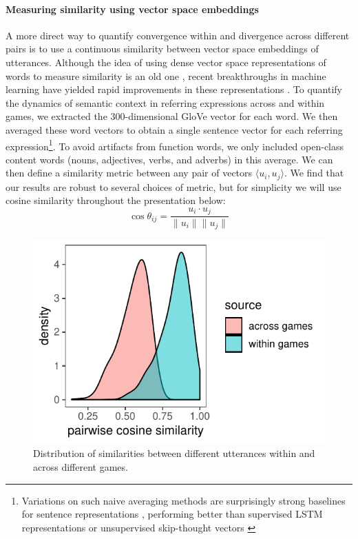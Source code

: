 \documentclass[alpha-refs]{wiley-article}
\begin{document}
\paragraph{Measuring similarity using vector space embeddings} 
A more direct way to quantify convergence within and divergence across different pairs is to use a continuous similarity between vector space embeddings of utterances.
Although the idea of using dense vector space representations of words to measure similarity is an old one \citep{osgood1952nature,landauer_solution_1997,bengio_neural_2003}, recent breakthroughs in machine learning have yielded rapid improvements in these representations \citep[e.g.][]{mikolov2013distributed,pennington2014glove}.
To quantify the dynamics of semantic context in referring expressions across and within games, we extracted the 300-dimensional GloVe vector for each word. 
We then averaged these word vectors to obtain a single sentence vector for each referring expression\footnote{Variations on such naive averaging methods are surprisingly strong baselines for sentence representations \citep{arora2017asimple}, performing better than supervised LSTM representations or unsupervised skip-thought vectors \citep{KirosEtAl15_SkipThought}}.
To avoid artifacts from function words, we only included open-class content words (nouns, adjectives, verbs, and adverbs) in this average.
We can then define a similarity metric between any pair of vectors $\langle u_i, u_j \rangle$.
We find that our results are robust to several choices of metric, but for simplicity we will use cosine similarity throughout the presentation below: $$\cos \theta_{ij} = \frac{u_i \cdot u_j}{\| u_i\| \| u_j \|}$$

\begin{figure}[t!]
\centering
\includegraphics[scale=.9]{across_vs_within.pdf}
\caption{Distribution of similarities between different utterances within and across different games.}
\label{fig:withinvsacross}
\end{figure}
\end{document}
